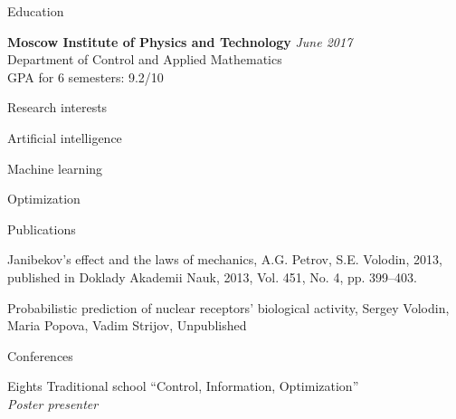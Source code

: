 \documentclass{resume} %
\begin{document}

\begin{rSection}{Education}

{\bf Moscow Institute of Physics and Technology} \hfill {\em June 2017} \\ 
Department of Control and Applied Mathematics\\
GPA for 6 semesters: 9.2/10

\end{rSection}


\begin{rSection}{Research interests}
	\item Artificial intelligence
	\item Machine learning
	\item Optimization

\end{rSection}


\begin{rSection}{Publications}
	\item Janibekov’s effect and the laws of mechanics, A.G. Petrov, S.E. Volodin, 2013, published in Doklady Akademii Nauk, 2013, Vol. 451, No. 4, pp. 399–403.
	
	\item Probabilistic prediction of nuclear receptors’ biological activity, Sergey Volodin, Maria Popova, Vadim Strijov, Unpublished
	
\end{rSection}

\begin{rSection}{Conferences}
\item Eights Traditional school “Control, Information, Optimization”\\
{\em Poster presenter}
\end{rSection}
\end{document}
